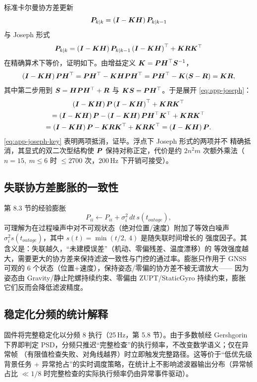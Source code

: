 标准卡尔曼协方差更新
\begin{equation}
  \boldsymbol{P}_{k|k} = \left(\boldsymbol{I} - \boldsymbol{K}\boldsymbol{H}\right)\boldsymbol{P}_{k|k-1}
  \label{eq:app-joseph-std}
\end{equation}
与 Joseph 形式
\begin{equation}
  \boldsymbol{P}_{k|k} = \left(\boldsymbol{I}-\boldsymbol{K}\boldsymbol{H}\right)\boldsymbol{P}_{k|k-1}
    \left(\boldsymbol{I}-\boldsymbol{K}\boldsymbol{H}\right)^{\top} + \boldsymbol{K}\boldsymbol{R}\boldsymbol{K}^{\top}
  \label{eq:app-joseph}
\end{equation}
在精确算术下等价，证明如下。由增益定义 $\boldsymbol{K} = \boldsymbol{P}\boldsymbol{H}^{\top}\boldsymbol{S}^{-1}$，
\begin{equation}
  \left(\boldsymbol{I}-\boldsymbol{K}\boldsymbol{H}\right)\boldsymbol{P}\boldsymbol{H}^{\top}
  = \boldsymbol{P}\boldsymbol{H}^{\top} - \boldsymbol{K}\boldsymbol{H}\boldsymbol{P}\boldsymbol{H}^{\top}
  = \boldsymbol{P}\boldsymbol{H}^{\top} - \boldsymbol{K}(\boldsymbol{S} - \boldsymbol{R})
  = \boldsymbol{K}\boldsymbol{R},
  \label{eq:app-joseph-key}
\end{equation}
其中第二步用到 $\boldsymbol{S} = \boldsymbol{H}\boldsymbol{P}\boldsymbol{H}^{\top} + \boldsymbol{R}$ 与 $\boldsymbol{K}\boldsymbol{S} =
\boldsymbol{P}\boldsymbol{H}^{\top}$。于是展开 \cref{eq:app-joseph}：
\begin{multline}
  \left(\boldsymbol{I}-\boldsymbol{K}\boldsymbol{H}\right)\boldsymbol{P}\left(\boldsymbol{I}-\boldsymbol{K}\boldsymbol{H}\right)^{\top}
  + \boldsymbol{K}\boldsymbol{R}\boldsymbol{K}^{\top} \\
  = \left(\boldsymbol{I}-\boldsymbol{K}\boldsymbol{H}\right)\boldsymbol{P}
    - \left(\boldsymbol{I}-\boldsymbol{K}\boldsymbol{H}\right)\boldsymbol{P}\boldsymbol{H}^{\top}\boldsymbol{K}^{\top}
  + \boldsymbol{K}\boldsymbol{R}\boldsymbol{K}^{\top} \\
  = \left(\boldsymbol{I}-\boldsymbol{K}\boldsymbol{H}\right)\boldsymbol{P}
    - \boldsymbol{K}\boldsymbol{R}\boldsymbol{K}^{\top} + \boldsymbol{K}\boldsymbol{R}\boldsymbol{K}^{\top}
  = \left(\boldsymbol{I}-\boldsymbol{K}\boldsymbol{H}\right)\boldsymbol{P}.
  \label{eq:app-joseph-eq}
\end{multline}
\cref{eq:app-joseph-key} 表明两项抵消，证毕。浮点下 Joseph 形式的两项并不
精确抵消，其显式的双二次型结构使 $\boldsymbol{P}$ 保持对称正定，代价是约 $2n^2m$
次额外乘法（$n=15,\ m\le6$ 时 $\le 2700$ 次，200\,Hz 下开销可接受）。

\subsection{失联协方差膨胀的一致性}

第 8.3 节的经验膨胀
\begin{equation}
  P_{ii} \leftarrow P_{ii} + \sigma_i^2\,dt\,s(t_{outage}),
  \label{eq:app-growth}
\end{equation}
可理解为在过程噪声中对不可观状态（绝对位置/速度）附加了等效白噪声
$\sigma_i^2 s(t_{outage})$，其中 $s(t) = \min(t/2,\ 4)$ 是随失联时间增长的
强度因子。其含义是：失联越久，``未建模误差''（机动、零偏残差、温度漂移）的
等效强度越大，需要更大的协方差来保持滤波一致性与门控的通过率。膨胀只作用于
GNSS 可观的 6 个状态（位置+速度），保持姿态/零偏的协方差不被无谓放大——
因为姿态由 Gravity/静止陀螺持续约束、零偏由 ZUPT/StaticGyro 持续约束，膨胀
它们反而会降低滤波精度。

\subsection{稳定化分频的统计解释}

固件将完整稳定化以分频 8 执行（25\,Hz，第 5.8 节）。由于多数帧经 Gershgorin
下界即判定 PSD，分频只推迟``完整检查''的执行频率，不改变数学语义；仅在异常帧
（有限值检查失败、对角线越界）时立即触发完整路径。这等价于``低优先级背景任务
+ 异常抢占''的实时调度策略，在统计上不影响滤波器输出分布（异常帧占比
$\ll1/8$ 时完整检查的实际执行频率仍由异常事件驱动）。
